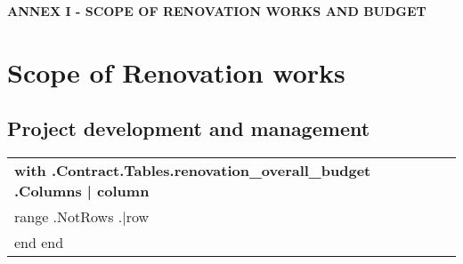 \documentclass[a4paper]{article}
\begin{document}
\begin{minipage}{\textwidth}
\centering
\begin{Large}
\textbf{ANNEX I {-} SCOPE OF RENOVATION WORKS AND BUDGET}
\end{Large}
\end{minipage}

\section{Scope of Renovation works}
\subsection{Project development and management}

\begin{center}
\begin{tabu}{|X|X[2]|} \tabucline{} \rowfont[c]\bfseries
{{with .Contract.Tables.renovation_overall_budget }}
	{{.Columns | column}} \\\tabucline{}
	{{range .NotRows}}
	{{.|row}} \\\tabucline{}
	{{end}}
{{end}}
\end{tabu}
\end{center}
\end{document}

